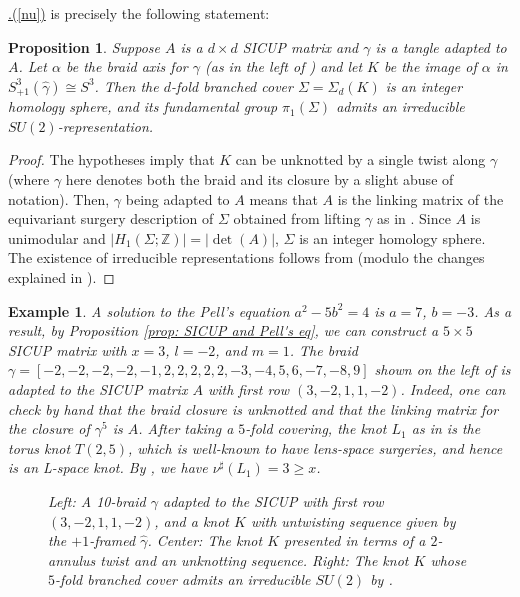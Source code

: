 \documentclass[11pt]{amsart}
\newtheorem{proposition}[theorem]{Proposition}
\newtheorem{exmp}[theorem]{Example}
\newcommand{\Crefparts}[2]{%
  \hyperref[#2]{\Cref*{#1}.(\ref*{#2})}%
}
\newcommand{\Z}{\mathbb{Z}}
\begin{document}
\Crefparts{mainthm}{nu} is precisely the following statement:
\begin{proposition}\label{existence_sicup}
Suppose $A$ is a $d\times d$ SICUP matrix and $\gamma$ is a tangle adapted to $A$. Let $\alpha$ be the braid axis for $\gamma$ (as in the left of ) %
and let $K$ be the image of $\alpha$ in $S^3_{+1}(\widehat{\gamma})\cong S^3$. Then the $d$-fold branched cover $\Sigma=\Sigma_d(K)$ is an integer homology sphere, and its fundamental group $\pi_1(\Sigma)$ admits an irreducible $SU(2)$-representation.
\end{proposition}

\begin{proof} The hypotheses imply that $K$ can be unknotted by a single twist along $\gamma$ (where $\gamma$ here denotes both the braid and its closure by a slight abuse of notation). Then, $\gamma$ being adapted to $A$ means that $A$ is the linking matrix of the equivariant surgery description of $\Sigma$ obtained from lifting $\gamma$ as in . Since $A$ is unimodular and $|H_1(\Sigma;\Z)|=|\det(A)|$, $\Sigma$ is an integer homology sphere. The existence of irreducible representations follows from  (modulo the changes explained in ).
\end{proof}

\begin{exmp}
A solution to the Pell's equation $a^2-5b^2 = 4$ is $a=7$, $b=-3$. As a result, by Proposition \ref{prop: SICUP and Pell's eq}, we can construct a $5\times 5$ SICUP matrix with $x=3$, $l=-2$, and $m=1$. The braid $\gamma=[-2,-2,-2,-2,-1,2,2,2,2,2,-3,-4,5,6,-7,-8,9]$ shown on the left of  is adapted to the SICUP matrix $A$ with first row $(3, -2, 1, 1, -2)$. Indeed, one can check by hand that the braid closure is unknotted and that the linking matrix for the closure of $\gamma^5$ is $A$. After taking a $5$-fold covering, the knot $L_1$ as in  is the torus knot $T(2,5)$, which is well-known to have lens-space surgeries, and hence is an L-space knot. By \cite[Theorem 1.18]{baldwin2020concordance}, we have $\nu^{\sharp}(L_1) = 3\geq x$. %

\begin{figure}[h]
\centering
\def\svgwidth{0.2875\textwidth}\quad
\def\svgwidth{0.2875\textwidth}\quad
\def\svgwidth{0.35\textwidth}
\caption{Left: A 10-braid $\gamma$ adapted to the SICUP with first row $(3,-2,1,1,-2)$, and a knot $K$ with untwisting sequence given by the $+1$-framed $\widehat{\gamma}$. Center: The knot $K$ presented in terms of a $2$-annulus twist and an unknotting sequence. Right: The knot $K$ whose $5$-fold branched cover admits an irreducible $SU(2)$ by .}\label{fig: exmp of 10 braid}
\end{figure}
\end{exmp}
\end{document}
